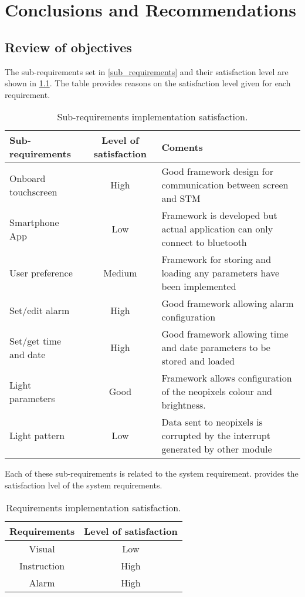 \chapter{Conclusions and Recommendations}

\section{Review of objectives}
The sub-requirements set in \ref{sub_requirements} and their satisfaction level are shown in \cref{table:conclusion_subrequirements}. The table provides reasons on the satisfaction level given for each requirement.
\begin{table}[h!]
	\centering
	\caption{Sub-requirements implementation satisfaction.}
	\label{table:conclusion_subrequirements}
	\begin{tabular}{p{10em}cp{15em}}
		\hline
		\hline
		\toprule
		\textbf{Sub-requirements} & \textbf{Level of satisfaction} & \textbf{Coments}\\
		\bottomrule
		\toprule
		Onboard touchscreen & High & Good framework design for communication between screen and STM\\
		\midrule
		Smartphone App & Low & Framework is developed but actual application can only connect to bluetooth\\
		\midrule
		User preference & Medium & Framework for storing and loading any parameters have been implemented\\
		\midrule
		Set/edit alarm & High& Good framework allowing alarm configuration\\
		Set/get time and date & High & Good framework allowing time and date parameters to be stored and loaded\\
		\midrule
		Light parameters & Good & Framework allows configuration of the neopixels colour and brightness.\\
		\midrule
		Light pattern & Low & Data sent to neopixels is corrupted by the interrupt generated by other module\\
		\bottomrule
		\hline
		\hline
	\end{tabular}
\end{table}
Each of these sub-requirements is related to the system requirement.  provides the satisfaction lvel of the system requirements. 
\begin{table}[h!]
	\centering
	\caption{Requirements implementation satisfaction.}
	\label{table:conclusion_requirements}
	\begin{tabular}{cc}
		\hline
		\hline
		\toprule
		\textbf{Requirements} & \textbf{Level of satisfaction}\\
		\bottomrule
		\toprule
		Visual & Low \\
		\midrule
		Instruction & High \\
		\midrule
		Alarm & High \\
		\bottomrule
		\hline
		\hline
	\end{tabular}
\end{table}
